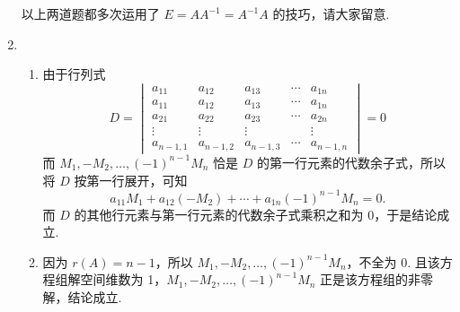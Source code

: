 \begin{enumerate}
    以上两道题都多次运用了 $E = AA^{-1} = A^{-1}A$ 的技巧，请大家留意.

    \item \begin{enumerate}
        \item 由于行列式 \[ D = \begin{vmatrix}
            a_{11} & a_{12} & a_{13} & \cdots & a_{1n} \\
            a_{11} & a_{12} & a_{13} & \cdots & a_{1n} \\
            a_{21} & a_{22} & a_{23} & \cdots & a_{2n} \\
            \vdots & \vdots & \vdots &        & \vdots \\
            a_{n-1, 1} & a_{n-1, 2} & a_{n-1, 3} & \cdots & a_{n-1, n}
        \end{vmatrix} = 0\]
        而 $M_1, -M_2, \ldots, (-1)^{n-1}M_n$ 恰是 $D$ 的第一行元素的代数余子式，所以将 $D$ 按第一行展开，可知\[a_{11}M_1+a_{12}(-M_2)+\cdots+a_{1n}(-1)^{n-1}M_n=0.\]
        而 $D$ 的其他行元素与第一行元素的代数余子式乘积之和为 0，于是结论成立.
        \item 因为 $r(A) = n-1$，所以 $M_1, -M_2, \ldots, (-1)^{n-1}M_n$，不全为 0. 且该方程组解空间维数为 1，$M_1, -M_2, \ldots, (-1)^{n-1}M_n$ 正是该方程组的非零解，结论成立.
    \end{enumerate}


\end{enumerate}
